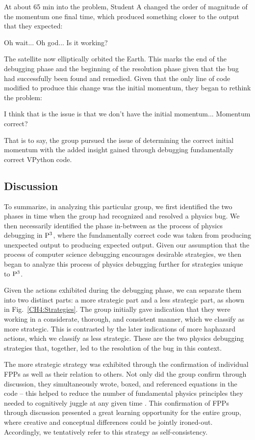 \documentclass{msuphddissertation}
\begin{document}
\begin{doublespace}
At about 65 min into the problem, Student A changed the order of magnitude of the momentum one final time, which produced something closer to the output that they expected: \begin{description}
\SA Oh wait... Oh god...
\SD Is it working?\end{description}  The satellite now elliptically orbited the Earth. This marks the end of the debugging phase and the beginning of the resolution phase given that the bug had successfully been found and remedied. Given that the only line of code modified to produce this change was the initial momentum, they began to rethink the problem: \begin{description}
\SD I think that is the issue is that we don't have the initial momentum...
\SA Momentum correct?\end{description}  That is to say, the group pursued the issue of determining the correct initial momentum with the added insight gained through debugging fundamentally correct VPython code.

\subsection{Discussion}

To summarize, in analyzing this particular group, we first identified the two phases in time when the group had recognized and resolved a physics bug. We then necessarily identified the phase in-between as the process of physics debugging in ${\rm P}^{3}$, where the fundamentally correct code was taken from producing unexpected output to producing expected output. Given our assumption that the process of computer science debugging encourages desirable strategies, we then began to analyze this process of physics debugging further for strategies unique to ${\rm P}^{3}$.

Given the actions exhibited during the debugging phase, we can separate them into two distinct parts: a more strategic part and a less strategic part, as shown in Fig.~\ref{CH4:Strategies}. The group initially gave indication that they were working in a considerate, thorough, and consistent manner, which we classify as more strategic. This is contrasted by the later indications of more haphazard actions, which we classify as less strategic. These are the two physics debugging strategies that, together, led to the resolution of the bug in this context.

The more strategic strategy was exhibited through the confirmation of individual FPPs as well as their relation to others. Not only did the group confirm through discussion, they simultaneously wrote, boxed, and referenced equations in the code -- this helped to reduce the number of fundamental physics principles they needed to cognitively juggle at any given time \cite{AAPT2016}. This confirmation of FPPs through discussion presented a great learning opportunity for the entire group, where creative and conceptual differences could be jointly ironed-out. Accordingly, we tentatively refer to this strategy as self-consistency.


\end{doublespace}
\end{document}

